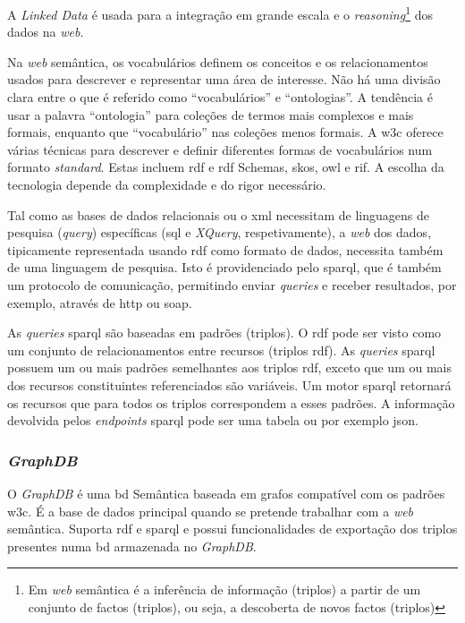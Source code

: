 A \textit{Linked Data} é usada para a integração em grande escala e o \textit{reasoning}\footnote{Em \textit{web} semântica é a inferência de informação (triplos) a partir de um conjunto de factos (triplos), ou seja, a descoberta de novos factos (triplos)} dos dados na \textit{web}.

Na \textit{web} semântica, os vocabulários definem os conceitos e os relacionamentos usados para descrever e representar uma área de interesse. Não há uma divisão clara entre o que é referido como ``vocabulários'' e ``ontologias''. A tendência é usar a palavra ``ontologia'' para coleções de termos mais complexos e mais formais, enquanto que ``vocabulário'' nas coleções menos formais. A \acrshort{w3c} oferece várias técnicas para descrever e definir diferentes formas de vocabulários num formato \textit{standard}. Estas incluem \acrshort{rdf} e \acrshort{rdf} Schemas, \acrshort{skos}, \acrshort{owl} e \acrshort{rif}. A escolha da tecnologia depende da complexidade e do rigor necessário.

Tal como as bases de dados relacionais ou o \acrshort{xml} necessitam de linguagens de pesquisa (\textit{query}) específicas (\acrshort{sql} e \textit{XQuery}, respetivamente), a \textit{web} dos dados, tipicamente representada usando \acrshort{rdf} como formato de dados, necessita também de uma linguagem de pesquisa. Isto é providenciado pelo \acrshort{sparql}, que é também um protocolo de comunicação, permitindo enviar \textit{queries} e receber resultados, por exemplo, através de \acrshort{http} ou \acrshort{soap}.

As \textit{queries} \acrshort{sparql} são baseadas em padrões (triplos). O \acrshort{rdf} pode ser visto como um conjunto de relacionamentos entre recursos (triplos \acrshort{rdf}). As \textit{queries} \acrshort{sparql} possuem um ou mais padrões semelhantes aos triplos \acrshort{rdf}, exceto que um ou mais dos recursos constituintes referenciados são variáveis. Um motor \acrshort{sparql} retornará os recursos que para todos os triplos correspondem a esses padrões. A informação devolvida pelos \textit{endpoints} \acrshort{sparql} pode ser uma tabela ou por exemplo \acrshort{json}.

\subsubsection{\textit{GraphDB}}

O \textit{GraphDB} é uma \acrfull{bd} Semântica baseada em grafos compatível com os padrões \acrshort{w3c}. É a base de dados principal quando se pretende trabalhar com a \textit{web} semântica. Suporta \acrshort{rdf} e \acrshort{sparql} e possui funcionalidades de exportação dos triplos presentes numa \acrshort{bd} armazenada no \textit{GraphDB}.

